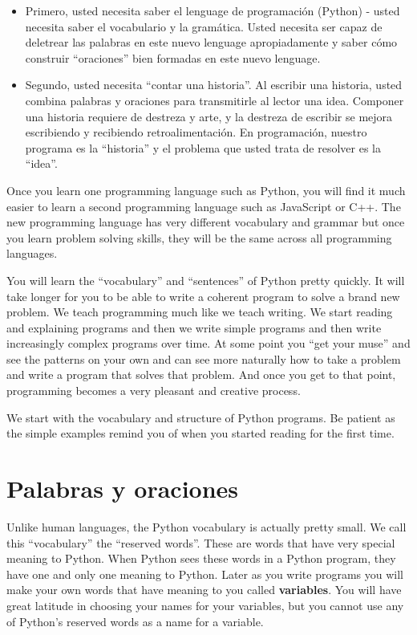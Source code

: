 \begin{itemize}

\item Primero, usted necesita saber el lenguage de programaci\'on (Python) -
usted necesita saber el vocabulario y la gram\'atica. Usted necesita ser capaz de deletrear las palabras en este nuevo lenguage apropiadamente y saber c\'omo construir ``oraciones'' bien formadas en este nuevo lenguage.

\item Segundo, usted necesita ``contar una historia''. Al escribir una historia,
usted combina palabras y oraciones para transmitirle al lector una idea. Componer una historia requiere de destreza y arte, y la destreza de escribir se mejora escribiendo y recibiendo retroalimentaci\'on. En programaci\'on, nuestro programa es la ``historia'' y el problema que usted trata de resolver es la ``idea''.

\end{itemize}

Once you learn one programming language such as Python, you will 
find it much easier to learn a second programming language such
as JavaScript or C++.  The new programming language has very different 
vocabulary and grammar but once you learn problem solving skills, 
they will be the same across all programming languages.

You will learn the ``vocabulary'' and ``sentences'' of Python pretty quickly.
It will take longer for you to be able to write a coherent program
to solve a brand new problem.  We teach programming much like we teach
writing.  We start reading and explaining programs and then we write 
simple programs and then write increasingly complex programs over time.
At some point you ``get your muse'' and see the patterns on your own
and can see more naturally how to take a problem and 
write a program that solves that problem.  And once you get 
to that point, programming becomes a very pleasant and creative process.  

We start with the vocabulary and structure of Python programs.  Be patient
as the simple examples remind you of when you started reading for the first
time. 

\section{Palabras y oraciones}

Unlike human languages, the Python vocabulary is actually pretty small.
We call this ``vocabulary'' the ``reserved words''.  These are words that
have very special meaning to Python.  When Python sees these words in 
a Python program, they have one and only one meaning to Python.  Later
as you write programs you will make your own words that have meaning to 
you called {\bf variables}.   You will have great latitude in choosing
your names for your variables, but you cannot use any of Python's 
reserved words as a name for a variable.

